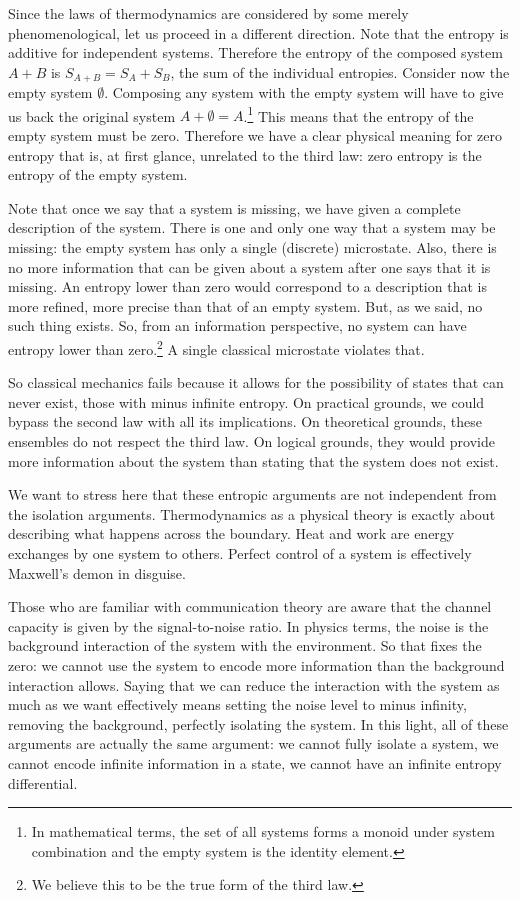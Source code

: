 \documentclass[10pt,twocolumn, nofootinbib]{revtex4-2}
\begin{document}
Since the laws of thermodynamics are considered by some merely phenomenological, let us proceed in a different direction. Note that the entropy is additive for independent systems. Therefore the entropy of the composed system $A+B$ is $S_{A+B} = S_A + S_B$, the sum of the individual entropies. Consider now the empty system $\emptyset$. Composing any system with the empty system will have to give us back the original system $A+\emptyset = A$.\footnote{In mathematical terms, the set of all systems forms a monoid under system combination and the empty system is the identity element.} This means that the entropy of the empty system must be zero. Therefore we have a clear physical meaning for zero entropy that is, at first glance, unrelated to the third law: zero entropy is the entropy of the empty system.

Note that once we say that a system is missing, we have given a complete description of the system. There is one and only one way that a system may be missing: the empty system has only a single (discrete) microstate. Also, there is no more information that can be given about a system after one says that it is missing. An entropy lower than zero would correspond to a description that is more refined, more precise than that of an empty system. But, as we said, no such thing exists. So, from an information perspective, no system can have entropy lower than zero.\footnote{We believe this to be the true form of the third law.} A single classical microstate violates that.

So classical mechanics fails because it allows for the possibility of states that can never exist, those with minus infinite entropy. On practical grounds, we could bypass the second law with all its implications. On theoretical grounds, these ensembles do not respect the third law. On logical grounds, they would provide more information about the system than stating that the system does not exist.

We want to stress here that these entropic arguments are not independent from the isolation arguments. Thermodynamics as a physical theory is exactly about describing what happens across the boundary. Heat and work are energy exchanges by one system to others. Perfect control of a system is effectively Maxwell’s demon in disguise.

Those who are familiar with communication theory are aware that the channel capacity is given by the signal-to-noise ratio. In physics terms, the noise is the background interaction of the system with the environment. So that fixes the zero: we cannot use the system to encode more information than the background interaction allows. Saying that we can reduce the interaction with the system as much as we want effectively means setting the noise level to minus infinity, removing the background, perfectly isolating the system. In this light, all of these arguments are actually the same argument: we cannot fully isolate a system, we cannot encode infinite information in a state, we cannot have an infinite entropy differential.
\end{document}
